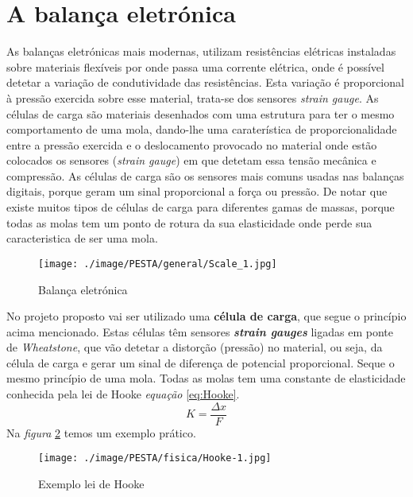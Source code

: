 \section{A balança eletrónica}
As balanças eletrónicas mais modernas, utilizam resistências elétricas instaladas sobre materiais flexíveis por onde passa uma corrente elétrica, onde é possível detetar a variação de condutividade das resistências. Esta variação é proporcional à pressão exercida sobre esse material, trata-se dos sensores \textit{strain gauge}. As células de carga são materiais desenhados com uma estrutura para ter o mesmo comportamento de uma mola, dando-lhe uma caraterística de proporcionalidade entre a pressão exercida e o deslocamento provocado no material onde estão colocados os sensores (\textit{strain gauge}) em que detetam essa tensão mecânica e compressão. As células de carga são os sensores mais comuns usadas nas balanças digitais, porque geram um sinal proporcional a força ou pressão. De notar que existe muitos tipos de células de carga para diferentes gamas de massas, porque todas as molas tem um ponto de rotura da sua elasticidade onde perde sua caracteristica de ser uma mola.
\\
\begin{figure}[H]
	\centering
	\texttt{[image: ./image/PESTA/general/Scale\_1.jpg]}
	\caption{Balança eletrónica}
	\label{Scale_1}
\end{figure}
No projeto proposto vai ser utilizado uma \textbf{célula de carga}, que segue o princípio acima mencionado. Estas células têm sensores \textit{\textbf{strain gauges}} ligadas em ponte de \textit{Wheatstone}, que vão detetar a distorção (pressão) no material, ou seja, da célula de carga e gerar um sinal de diferença de potencial proporcional. Seque o mesmo princípio de uma mola. Todas as molas tem uma constante de elasticidade conhecida pela lei de Hooke \cite{book-3} \textit{equação} \ref{eq:Hooke}.\\
\begin{equation}
	\label{eq:Hooke}
	K = \frac{\Delta x}{F}
\end{equation}
Na \textit{figura} \ref{Hooke-1} temos um exemplo prático.
\begin{figure}[H]
	\centering
	\texttt{[image: ./image/PESTA/fisica/Hooke-1.jpg]}
	\caption{Exemplo lei de Hooke \cite{book-3}}
	\label{Hooke-1}
\end{figure}
